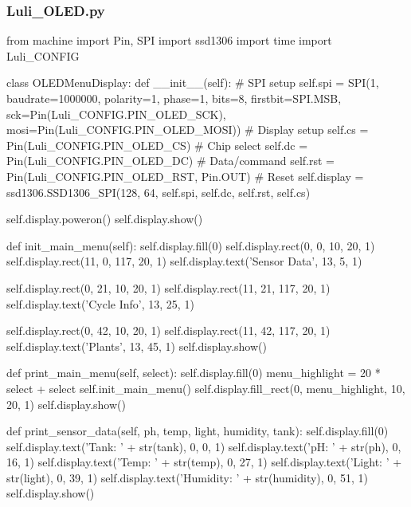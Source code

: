 \documentclass[12pt]{article} %
\begin{document}
\subsubsection{Luli\_OLED.py}
\begin{pythoncode}[caption={Pico W OLED Display Code}]
    from machine import Pin, SPI
    import ssd1306
    import time
    import Luli_CONFIG
    
    class OLEDMenuDisplay:
        def __init__(self):
            # SPI setup
            self.spi = SPI(1, baudrate=1000000, polarity=1, phase=1, bits=8, firstbit=SPI.MSB,
                           sck=Pin(Luli_CONFIG.PIN_OLED_SCK), mosi=Pin(Luli_CONFIG.PIN_OLED_MOSI))
            # Display setup
            self.cs = Pin(Luli_CONFIG.PIN_OLED_CS)   # Chip select
            self.dc = Pin(Luli_CONFIG.PIN_OLED_DC)   # Data/command
            self.rst = Pin(Luli_CONFIG.PIN_OLED_RST, Pin.OUT)   # Reset
            self.display = ssd1306.SSD1306_SPI(128, 64, self.spi, self.dc, self.rst, self.cs)
    
            self.display.poweron()
            self.display.show()
    
        def init_main_menu(self):
            self.display.fill(0)
            self.display.rect(0, 0, 10, 20, 1)
            self.display.rect(11, 0, 117, 20, 1)
            self.display.text('Sensor Data', 13, 5, 1)
    
            self.display.rect(0, 21, 10, 20, 1)
            self.display.rect(11, 21, 117, 20, 1)
            self.display.text('Cycle Info', 13, 25, 1)
            
            self.display.rect(0, 42, 10, 20, 1)
            self.display.rect(11, 42, 117, 20, 1)
            self.display.text('Plants', 13, 45, 1)
            self.display.show()
    
        def print_main_menu(self, select):
            self.display.fill(0)
            menu_highlight = 20 * select + select
            self.init_main_menu()
            self.display.fill_rect(0, menu_highlight, 10, 20, 1)
            self.display.show()
    
        def print_sensor_data(self, ph, temp, light, humidity, tank):
            self.display.fill(0)
            self.display.text('Tank: ' + str(tank), 0, 0, 1)
            self.display.text('pH: ' + str(ph), 0, 16, 1)
            self.display.text('Temp: ' + str(temp), 0, 27, 1)
            self.display.text('Light: ' + str(light), 0, 39, 1)
            self.display.text('Humidity: ' + str(humidity), 0, 51, 1)
            self.display.show()
    

\end{pythoncode}
\end{document}
